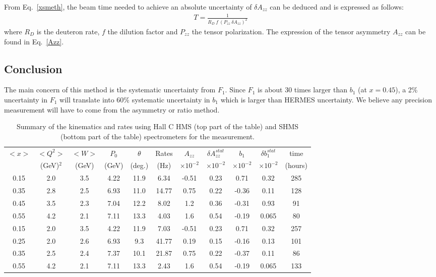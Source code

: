 From Eq.~\ref{xsmeth}, the beam time needed to achieve an absolute uncertainty 
of $\delta A_{zz}$ can be deduced and is expressed as follows:
\begin{eqnarray}
T = \frac{1}{R_D~f~(P_{zz}~\delta A_{zz})^2}
\label{time-eq}
\end{eqnarray}
where $R_D$ is the deuteron rate, $f$ the dilution factor and $P_{zz}$ the tensor polarization. 
The expression of the tensor asymmetry $A_{zz}$ can be found in Eq.~\ref{Azz}.

\subsection{Conclusion}

The main concern of this method is the systematic uncertainty from $F_1$. 
Since $F_1$ is about 30 times larger than $b_1$ (at $x = 0.45$),  a 2\% uncertainty in $F_1$
will translate into 60\% systematic uncertainty in $b_1$ which is larger than HERMES uncertainty.
We believe any precision measurement will have to come from the asymmetry or ratio method.

\begin{table}
\begin{center}
\caption{\label{RATES}Summary of the kinematics and rates using Hall C HMS (top part of the table) and SHMS (bottom part of the table) spectrometers for the measurement.}
\begin{tabular}{|ccc|cc|c|cc|cc|c|}\hline
 $<x>$  & $<Q^2>$      &  $<W>$  &    $P_0$    &    $\theta$  &  Rates & $A_{zz}$ & $\delta A_{zz}^{stat}$    & $b_1$  & $\delta b_1^{stat}$ & time   \\
  ~     & (GeV)$^2$  & (GeV) & (GeV)  &     (deg.)  &   (Hz)  & $\times 10^{-2}$ & $\times 10^{-2}$ &  $\times 10^{-2}$ & $\times 10^{-2}$    & (hours) \\
\hline\hline
0.15 &   2.0 &    3.5 &   4.22 &   11.9 &   6.34 & -0.51 &  0.23 &  0.71 & 0.32  &   285 \\
0.35 &   2.8 &    2.5 &   6.93 &   11.0 &  14.77 &  0.75 &  0.22 & -0.36 & 0.11  &   128 \\
0.45 &   3.5 &    2.3 &   7.04 &   12.2 &   8.02 &  1.2  &  0.36 & -0.31 & 0.93  &    91 \\
0.55 &   4.2 &    2.1 &   7.11 &   13.3 &   4.03 &  1.6  &  0.54 & -0.19 & 0.065 &    80 \\
\hline\hline
0.15 &   2.0 &    3.5 &   4.22 &   11.9 &   7.03 & -0.51 &  0.23 &  0.71 & 0.32  &   257 \\
0.25 &   2.0 &    2.6 &   6.93 &    9.3 &  41.77 &  0.19 &  0.15 & -0.16 & 0.13  &   101 \\
0.35 &   2.5 &    2.4 &   7.37 &   10.1 &  21.87 &  0.75 &  0.22 & -0.37 & 0.11  &    86 \\
0.55 &   4.2 &    2.1 &   7.11 &   13.3 &   2.43 &  1.6  &  0.54 & -0.19 & 0.065 &   133 \\
\hline\hline
\end{tabular}
\end{center}
\end{table}

